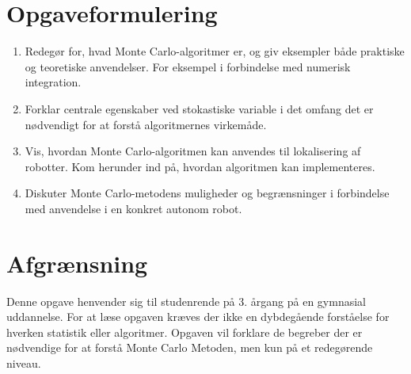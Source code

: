 \documentclass[../../SRP.tex]{subfiles}
\begin{document}
\section{Opgaveformulering}
  \begin{enumerate}[label=(\Roman*)]
  \item Redegør for, hvad Monte Carlo-algoritmer er, og giv eksempler både praktiske og teoretiske anvendelser. For eksempel i forbindelse med numerisk integration.

  \item Forklar centrale egenskaber ved stokastiske variable i det omfang det er nødvendigt for at forstå algoritmernes virkemåde.

  \item Vis, hvordan Monte Carlo-algoritmen kan anvendes til lokalisering af robotter. Kom herunder ind på, hvordan algoritmen kan implementeres.

  \item Diskuter Monte Carlo-metodens muligheder og begrænsninger i forbindelse med anvendelse i en konkret autonom robot.
  \end{enumerate}

\section{Afgrænsning}
Denne opgave henvender sig til studenrende på 3. årgang på en gymnasial uddannelse. For at læse opgaven kræves der ikke en dybdegående forståelse for hverken statistik eller algoritmer.  Opgaven vil forklare de begreber der er nødvendige for at forstå Monte Carlo Metoden, men kun på et redegørende niveau. 
\end{document}
